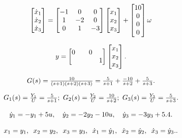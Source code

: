 \documentclass{article}
\begin{document}
\[
$$
\left[ \begin{matrix} {\dot{x}_{1}} \\ {\dot{x}_{2}} \\ {\dot{x}_{3}} \\ \end{matrix} \right]=\left[ \begin{matrix} {-1} & {0} & {0} \\ {1} & {-2} & {0} \\ {0} & {1} & {-3} \\ \end{matrix} \right] \left[ \begin{matrix} {x_{1}} \\ {x_{2}} \\ {x_{3}} \\ \end{matrix} \right]+\left[ \begin{matrix} {1 0} \\ {0} \\ {0} \\ {0} \\ \end{matrix} \right] \omega
$$
\]

\[
$$
y=\left[ \begin{matrix} {0} & {} & {0} \\ {} & {} & {} & {1} \\ \end{matrix} \right] \left[ \begin{matrix} {x_{1}} \\ {x_{2}} \\ {x_{3}} \\ \end{matrix} \right].
$$
\]

\[
$$
G ( s )=\frac{1 0} {( s+1 ) ( s+2 ) ( s+3 )}=\frac{5} {s+1}+\frac{-1 0} {s+2}+\frac{5} {s+3}.
$$
\]

\[
$$
G_{1} ( s )=\frac{Y_{1}} {U}=\frac{5} {s+1} ; \ G_{2} ( s )=\frac{Y_{2}} {U}=\frac{1 0} {s+2} ; \ G_{3} ( s )=\frac{Y_{3}} {U}=\frac{5} {s+3}.
$$
\]

\[
$$
\dot{y}_{1}=-y_{1}+5 u, \quad\dot{y}_{2}=-2 y_{2}-1 0 u, \quad\dot{y}_{3}=-3 y_{3}+5.
$$
4.
\]

\[
$$
x_{1}=y_{1}, \; \; x_{2}=y_{2}, \; \; x_{3}=y_{3}, \; \; {\dot{x}}_{1}={\dot{y}}_{1}, \; \; {\dot{x}}_{2}={\dot{y}}_{2}, \; \; {\dot{x}}_{3}={\dot{y}}_{3}.
$$
.
\]
\end{document}

